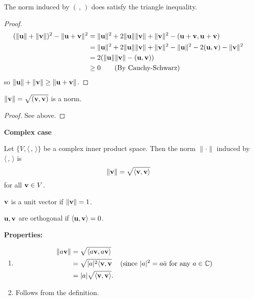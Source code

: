 \documentclass[10pt, a4paper]{article}
\begin{document}
\begin{corollary}
    The norm induced by $(\,,\,)$ does satisfy the triangle inequality.

    \begin{proof}
        \begin{align*}
            (\|\mathbf{u}\| + \|\mathbf{v}\|) ^ 2 - \|\mathbf{u} + \mathbf{v}\| ^ 2 &= \|\mathbf{u}\| ^ 2 + 2\|\mathbf{u}\|\|\mathbf{v}\| + \|\mathbf{v}\| ^ 2 - (\mathbf{u} + \mathbf{v}, \mathbf{u} + \mathbf{v}) \\
            &= \|\mathbf{u}\| ^ 2 + 2\|\mathbf{u}\|\|\mathbf{v}\| + \|\mathbf{v}\| ^ 2 - \|\mathbf{u}\| ^ 2 - 2(\mathbf{u}, \mathbf{v}) - \|\mathbf{v}\| ^ 2 \\
            &= 2(\|\mathbf{u}\|\|\mathbf{v}\| - (\mathbf{u}, \mathbf{v})) \\
            &\geq 0\qquad(\text{By Cauchy-Schwarz})
        \end{align*}
        so $\|\mathbf{u}\| + \|\mathbf{v}\| \geq \|\mathbf{u} + \mathbf{v}\|$.
    \end{proof}
\end{corollary}

\begin{proposition}
    $\|\mathbf{v}\| = \sqrt{(\mathbf{v}, \mathbf{v})}$ is a norm.

    \begin{proof}
        See above.
    \end{proof}
\end{proposition}

\textbf{Complex case}

\begin{definition}
    Let $\{V, \langle\,,\,\rangle\}$ be a complex inner product space.
    Then the norm $\|\cdot\|$ induced by $\langle\,,\,\rangle$ is
    \[
    \|\mathbf{v}\| = \sqrt{\langle\mathbf{v}, \mathbf{v}\rangle}
    \]
    for all $\mathbf{v} \in V$.
\end{definition}

\begin{definition}
    $\mathbf{v}$ is a unit vector if $\|\mathbf{v}\| = 1$.
\end{definition}

\begin{definition}
    $\mathbf{u}, \mathbf{v}$ are orthogonal if $\langle\mathbf{u}, \mathbf{v}\rangle = 0$.
\end{definition}

\textbf{Properties:}
\begin{enumerate}[label = (\roman*)]
    \item 
    \begin{align*}
        \|a\mathbf{v}\| &= \sqrt{\langle a\mathbf{v}, a\mathbf{v}\rangle} \\
        &= \sqrt{|a| ^ 2\langle\mathbf{v}, \mathbf{v}} & (\text{since $|a| ^ 2 = a\bar{a}$ for any $a \in \mathbb{C}$}) \\
        &= |a|\sqrt{\langle\mathbf{v}, \mathbf{v}\rangle}.
    \end{align*}

    \item Follows from the definition.
\end{enumerate}
\end{document}
